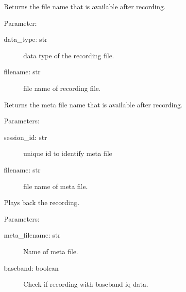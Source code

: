 \documentclass[letterpaper,10pt,english]{sphinxmanual}
\begin{document}
\begin{fulllineitems}
\label{\detokenize{X4 radar:X4_record_playback.on_file_available}}
Returns the file name that is available after recording.

Parameter:
\begin{description}
\item[{data\_type: str}] \leavevmode
data type of the recording file.

\item[{filename: str}] \leavevmode
file name of recording file.

\end{description}

\end{fulllineitems}


\begin{fulllineitems}
\label{\detokenize{X4 radar:X4_record_playback.on_meta_file_available}}
Returns the meta file name that is available after recording.

Parameters:
\begin{description}
\item[{session\_id: str}] \leavevmode
unique id to identify meta file

\item[{filename: str}] \leavevmode
file name of meta file.

\end{description}

\end{fulllineitems}


\begin{fulllineitems}
\label{\detokenize{X4 radar:X4_record_playback.playback_recording}}
Plays back the recording.

Parameters:
\begin{description}
\item[{meta\_filename: str}] \leavevmode
Name of meta file.

\item[{baseband: boolean}] \leavevmode
Check if recording with baseband iq data.

\end{description}

\end{fulllineitems}
\end{document}
